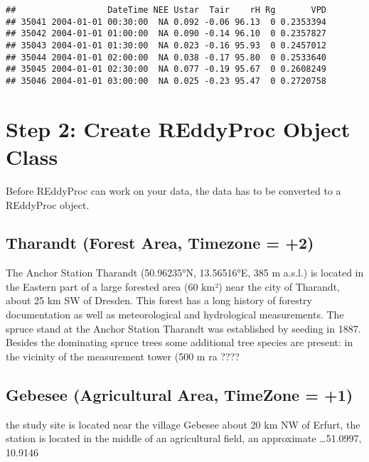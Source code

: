 \documentclass[
]{article}
\begin{document}
\begin{verbatim}
##                  DateTime NEE Ustar  Tair    rH Rg       VPD
## 35041 2004-01-01 00:30:00  NA 0.092 -0.06 96.13  0 0.2353394
## 35042 2004-01-01 01:00:00  NA 0.090 -0.14 96.10  0 0.2357827
## 35043 2004-01-01 01:30:00  NA 0.023 -0.16 95.93  0 0.2457012
## 35044 2004-01-01 02:00:00  NA 0.038 -0.17 95.80  0 0.2533640
## 35045 2004-01-01 02:30:00  NA 0.077 -0.19 95.67  0 0.2608249
## 35046 2004-01-01 03:00:00  NA 0.025 -0.23 95.47  0 0.2720758
\end{verbatim}

\hypertarget{step-2-create-reddyproc-object-class}{%
\section{Step 2: Create REddyProc Object
Class}\label{step-2-create-reddyproc-object-class}}

Before REddyProc can work on your data, the data has to be converted to
a REddyProc object.

\hypertarget{tharandt-forest-area-timezone-2}{%
\subsection{Tharandt (Forest Area, Timezone =
+2)}\label{tharandt-forest-area-timezone-2}}

The Anchor Station Tharandt (50.96235°N, 13.56516°E, 385 m a.s.l.) is
located in the Eastern part of a large forested area (60 km²) near the
city of Tharandt, about 25 km SW of Dresden. This forest has a long
history of forestry documentation as well as meteorological and
hydrological measurements. The spruce stand at the Anchor Station
Tharandt was established by seeding in 1887. Besides the dominating
spruce trees some additional tree species are present: in the vicinity
of the measurement tower (500 m ra ????

\hypertarget{gebesee-agricultural-area-timezone-1}{%
\subsection{Gebesee (Agricultural Area, TimeZone =
+1)}\label{gebesee-agricultural-area-timezone-1}}

the study site is located near the village Gebesee about 20 km NW of
Erfurt, the station is located in the middle of an agricultural field,
an approximate \ldots51.0997, 10.9146
\end{document}
